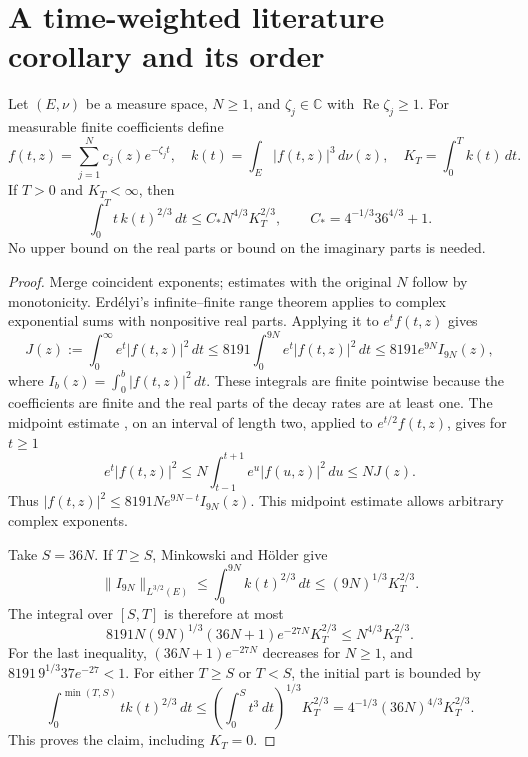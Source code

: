 \section{A time-weighted literature corollary and its order}
\label{sec:time-weighted}

\begin{corollary}
\label{lem:ub-delay}
Let $(E,\nu)$ be a measure space, $N\ge1$, and
$\zeta_j\in\mathbb C$ with $\operatorname{Re}\zeta_j\ge1$.
For measurable finite coefficients define
\[
 f(t,z)=\sum_{j=1}^N c_j(z)e^{-\zeta_jt},\quad
 k(t)=\int_E|f(t,z)|^3\,d\nu(z),\quad K_T=\int_0^Tk(t)\,dt.
\]
If $T>0$ and $K_T<\infty$, then
\begin{equation}\label{eq:ub-delay}
 \int_0^Tt\,k(t)^{2/3}\,dt\le C_*N^{4/3}K_T^{2/3},
 \qquad C_*=4^{-1/3}36^{4/3}+1.
\end{equation}
No upper bound on the real parts or bound on the imaginary parts is needed.
\end{corollary}

\begin{proof}
Merge coincident exponents; estimates with the original $N$ follow by
monotonicity. Erd\'elyi's infinite--finite range theorem
\cite[Theorem 3.1, arXiv v1]{Erdelyi2017} applies to complex exponential
sums with nonpositive real parts. Applying it to $e^tf(t,z)$ gives
\[
 J(z):=\int_0^\infty e^t|f(t,z)|^2\,dt
 \le8191\int_0^{9N}e^t|f(t,z)|^2\,dt
 \le8191e^{9N}I_{9N}(z),
\]
where $I_b(z)=\int_0^b|f(t,z)|^2\,dt$. These integrals are finite
pointwise because the coefficients are finite and the real parts of the
decay rates are at least one. The midpoint estimate
\cite[Lemma 12.5, arXiv v1]{Erdelyi2017}, on an interval of length two,
applied to $e^{t/2}f(t,z)$, gives for $t\ge1$
\[
 e^t|f(t,z)|^2\le N\int_{t-1}^{t+1}e^u|f(u,z)|^2\,du\le NJ(z).
\]
Thus $|f(t,z)|^2\le8191Ne^{9N-t}I_{9N}(z)$.
This midpoint estimate allows arbitrary complex exponents.

Take $S=36N$. If $T\ge S$, Minkowski and H\"older give
\[
 \|I_{9N}\|_{L^{3/2}(E)}
 \le\int_0^{9N}k(t)^{2/3}\,dt
 \le(9N)^{1/3}K_T^{2/3}.
\]
The integral over $[S,T]$ is therefore at most
\[
 8191N(9N)^{1/3}(36N+1)e^{-27N}K_T^{2/3}
 \le N^{4/3}K_T^{2/3}.
\]
For the last inequality, $(36N+1)e^{-27N}$ decreases for $N\ge1$,
and $8191\,9^{1/3}37e^{-27}<1$.
For either $T\ge S$ or $T<S$, the initial part is bounded by
\[
 \int_0^{\min(T,S)}t k(t)^{2/3}\,dt
 \le\left(\int_0^S t^3\,dt\right)^{1/3}K_T^{2/3}
 =4^{-1/3}(36N)^{4/3}K_T^{2/3}.
\]
This proves the claim, including $K_T=0$.
\end{proof}

